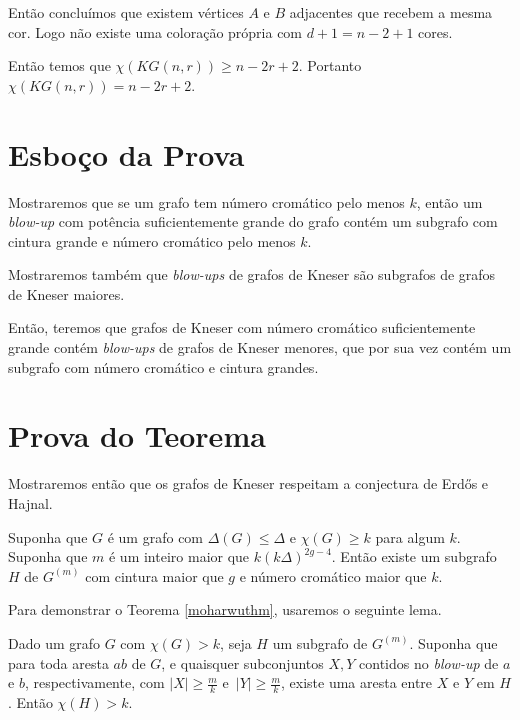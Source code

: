Então concluímos que existem vértices $A$ e $B$ adjacentes que recebem a mesma cor. Logo não existe uma coloração própria com $d+1 = n-2+1$ cores.

Então temos que $\chi(KG(n,r))\geq n-2r+2$. Portanto $\chi(KG(n,r)) = n-2r+2$.


\section{Esboço da Prova}

Mostraremos que se um grafo tem número cromático pelo menos $k$, então um \textit{blow-up} com potência suficientemente grande do grafo contém um subgrafo com cintura grande e número cromático pelo menos $k$.

Mostraremos também que \textit{blow-ups} de grafos de Kneser são subgrafos de grafos de Kneser maiores.

Então, teremos que grafos de Kneser com número cromático suficientemente grande contém \textit{blow-ups} de grafos de Kneser menores, que por sua vez contém um subgrafo com número cromático e cintura grandes.

\section{Prova do Teorema}

Mostraremos então que os grafos de Kneser respeitam a conjectura de Erd\H{o}s e Hajnal.

\begin{teorema}\label{moharwuthm}
Suponha que $G$ é um grafo com $\Delta(G) \leq \Delta$ e $\chi(G) \geq k$ para algum $k$. Suponha que $m$ é um inteiro maior que $k(k\Delta)^{2g-4}$. Então existe um subgrafo $H$ de $G^{(m)}$ com cintura maior que $g$ e número cromático maior que $k$.
\end{teorema}

Para demonstrar o Teorema \ref{moharwuthm}, usaremos o seguinte lema.

\begin{lema}\label{lemma1kg}
Dado um grafo $G$ com $\chi(G) > k$, seja $H$ um subgrafo de $G^{(m)}$. Suponha que para toda aresta $ab$ de $G$, e quaisquer subconjuntos $X,Y$ contidos no \textit{blow-up} de $a$ e $b$, respectivamente, com $|X| \geq \frac{m}{k}$ e~$|Y| \geq \frac{m}{k}$, existe uma aresta entre $X$ e $Y$ em $H$. Então $\chi(H) > k$.
\end{lema}

